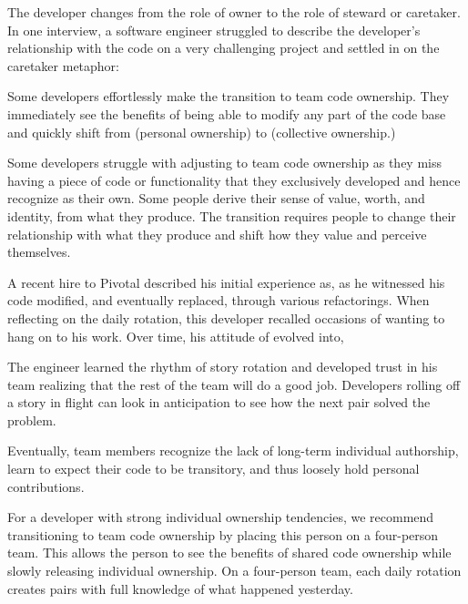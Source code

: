 The developer changes from the role of owner to the role of steward or caretaker. In one interview, a software engineer struggled to describe the developer's relationship with the code on a very challenging project and settled in on the caretaker metaphor: 

Some developers effortlessly make the transition to team code ownership. They immediately see the benefits of being able to modify any part of the code base and quickly shift from  (personal ownership) to  (collective ownership.)

Some developers struggle with adjusting to team code ownership as they miss having a piece of code or functionality that they exclusively developed and hence recognize as their own. Some people derive their sense of value, worth, and identity, from what they produce. The transition requires people to change their relationship with what they produce and shift how they value and perceive themselves. 

A recent hire to Pivotal described his initial experience as,  as he witnessed his code modified, and eventually replaced, through various refactorings. When reflecting on the daily rotation, this developer recalled occasions of wanting to hang on to his work.  Over time, his attitude of  evolved into,  

The engineer learned the rhythm of story rotation and developed trust in his team realizing that the rest of the team will do a good job. Developers rolling off a story in flight can look in anticipation to see how the next pair solved the problem. 

Eventually, team members recognize the lack of long-term individual authorship, learn to expect their code to be transitory, and thus loosely hold personal contributions.   

For a developer with strong individual ownership tendencies, we recommend transitioning to team code ownership by placing this person on a four-person team. This allows the person to see the benefits of shared code ownership while slowly releasing individual ownership. On a four-person team, each daily rotation creates pairs with full knowledge of what happened yesterday.  

